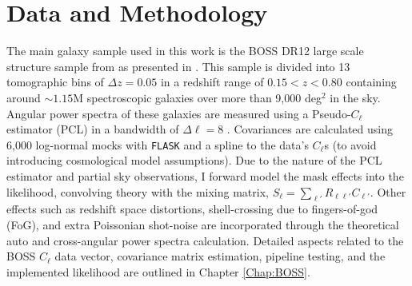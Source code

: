 \section{Data and Methodology}
The main galaxy sample used in this work is the BOSS DR12 large scale structure sample from \cite{BOSSCatalogue2016} as presented in \cite[][and in Chapter \ref{Chap:BOSS}]{2018LoureiroBOSS}. This sample is divided into 13 tomographic bins of $\Delta z = 0.05$ in a redshift range of $0.15 < z < 0.80$ containing around $\sim 1.15$M spectroscopic galaxies over more than 9,000 deg$^2$ in the sky. Angular power spectra of these galaxies are measured using a Pseudo-$C_{\ell}$ estimator (PCL) \citep[][ -- see Section \ref{Sec:Measurements}]{Thomas2011,Peebles1973,Efstat2004} in a bandwidth of $\Delta\ell =8$ \citep{2018LoureiroBOSS}. Covariances are calculated using 6,000 log-normal mocks with \texttt{FLASK} \citep{Flask2016} and a spline to the data's $C_{\ell}$s (to avoid introducing cosmological model assumptions). Due to the nature of the PCL estimator and partial sky observations, I forward model the mask effects into the likelihood, convolving theory with the mixing matrix, $S_{\ell} = \sum_{\ell'}R_{\ell \ell'} C_{\ell'}$. Other effects such as redshift space distortions, shell-crossing due to fingers-of-god (FoG), and extra Poissonian shot-noise are incorporated through the theoretical auto and cross-angular power spectra calculation. Detailed aspects related to the BOSS $C_{\ell}$ data vector, covariance matrix estimation, pipeline testing, and the implemented likelihood are outlined in Chapter \ref{Chap:BOSS}.

